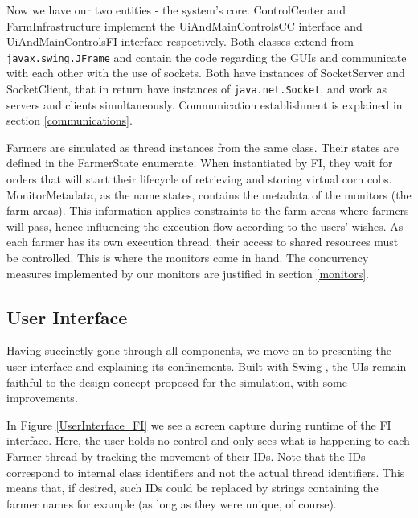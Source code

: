 \documentclass[12pt]{article}
\begin{document}
Now we have our two entities - the system's core.
ControlCenter and FarmInfrastructure implement the UiAndMainControlsCC interface and UiAndMainControlsFI interface respectively.
Both classes extend from \texttt{javax.swing.JFrame} and contain the code regarding the GUIs and communicate with each other with the use of sockets.
Both have instances of SocketServer and SocketClient, that in return have instances of \texttt{java.net.Socket}, and work as servers and clients simultaneously.
Communication establishment is explained in section \ref{communications}.

Farmers are simulated as thread instances from the same class.
Their states are defined in the FarmerState enumerate.
When instantiated by FI, they wait for orders that will start their lifecycle of retrieving and storing virtual corn cobs.
MonitorMetadata, as the name states, contains the metadata of the monitors (the farm areas).
This information applies constraints to the farm areas where farmers will pass, hence influencing the execution flow according to the users' wishes.
As each farmer has its own execution thread, their access to shared resources must be controlled.
This is where the monitors come in hand. 
The concurrency measures implemented by our monitors are justified in section \ref{monitors}. 

\subsection{User Interface} %

Having succinctly gone through all components, we move on to presenting the user interface and explaining its confinements.
Built with Swing \cite{swing}, the UIs remain faithful to the design concept proposed for the simulation, with some improvements.

In Figure \ref{UserInterface_FI} we see a screen capture during runtime of the FI interface.
Here, the user holds no control and only sees what is happening to each Farmer thread by tracking the movement of their IDs.
Note that the IDs correspond to internal class identifiers and not the actual thread identifiers.
This means that, if desired, such IDs could be replaced by strings containing the farmer names for example (as long as they were unique, of course).
\end{document}
